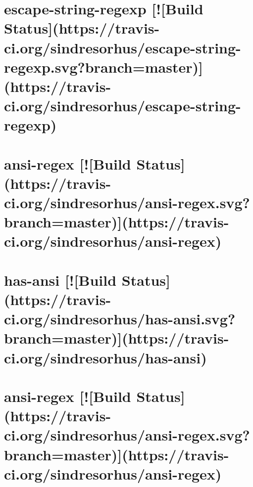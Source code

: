 \documentclass[twoside]{book}
\newcommand{\+}{\discretionary{\mbox{\scriptsize$\hookleftarrow$}}{}{}}
\begin{document}
\chapter{escape-\/string-\/regexp \mbox{[}!\mbox{[}Build Status\mbox{]}(https\+://travis-\/ci.org/sindresorhus/escape-\/string-\/regexp.svg?branch=master)\mbox{]}(https\+://travis-\/ci.org/sindresorhus/escape-\/string-\/regexp)}
\label{md__c_1__users_martin__documents__git_hub_visual_studio__bachelor__wis_r__wis_r_node_modules_gru5564fbbe0ecc651303052fb06d23bcb8}
\hypertarget{md__c_1__users_martin__documents__git_hub_visual_studio__bachelor__wis_r__wis_r_node_modules_gru5564fbbe0ecc651303052fb06d23bcb8}{}

\chapter{ansi-\/regex \mbox{[}!\mbox{[}Build Status\mbox{]}(https\+://travis-\/ci.org/sindresorhus/ansi-\/regex.svg?branch=master)\mbox{]}(https\+://travis-\/ci.org/sindresorhus/ansi-\/regex)}
\label{md__c_1__users_martin__documents__git_hub_visual_studio__bachelor__wis_r__wis_r_node_modules_gru9237cfe60c1e499395ea4dbf5b74baaa}
\hypertarget{md__c_1__users_martin__documents__git_hub_visual_studio__bachelor__wis_r__wis_r_node_modules_gru9237cfe60c1e499395ea4dbf5b74baaa}{}

\chapter{has-\/ansi \mbox{[}!\mbox{[}Build Status\mbox{]}(https\+://travis-\/ci.org/sindresorhus/has-\/ansi.svg?branch=master)\mbox{]}(https\+://travis-\/ci.org/sindresorhus/has-\/ansi)}
\label{md__c_1__users_martin__documents__git_hub_visual_studio__bachelor__wis_r__wis_r_node_modules_gru012f615e33e2950b60ee00171e896eba}
\hypertarget{md__c_1__users_martin__documents__git_hub_visual_studio__bachelor__wis_r__wis_r_node_modules_gru012f615e33e2950b60ee00171e896eba}{}

\chapter{ansi-\/regex \mbox{[}!\mbox{[}Build Status\mbox{]}(https\+://travis-\/ci.org/sindresorhus/ansi-\/regex.svg?branch=master)\mbox{]}(https\+://travis-\/ci.org/sindresorhus/ansi-\/regex)}
\label{md__c_1__users_martin__documents__git_hub_visual_studio__bachelor__wis_r__wis_r_node_modules_gru6b10bd01603eb2483d2c66a78645f04d}
\hypertarget{md__c_1__users_martin__documents__git_hub_visual_studio__bachelor__wis_r__wis_r_node_modules_gru6b10bd01603eb2483d2c66a78645f04d}{}

\end{document}
